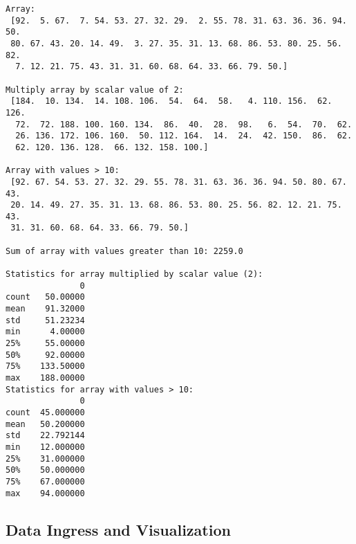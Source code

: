 \documentclass[journal]{IEEEtran}
\begin{document}
\begin{lstlisting}[caption={Arrays following Manipulation}]
Array:
 [92.  5. 67.  7. 54. 53. 27. 32. 29.  2. 55. 78. 31. 63. 36. 36. 94. 50.
 80. 67. 43. 20. 14. 49.  3. 27. 35. 31. 13. 68. 86. 53. 80. 25. 56. 82.
  7. 12. 21. 75. 43. 31. 31. 60. 68. 64. 33. 66. 79. 50.]

Multiply array by scalar value of 2:
 [184.  10. 134.  14. 108. 106.  54.  64.  58.   4. 110. 156.  62. 126.
  72.  72. 188. 100. 160. 134.  86.  40.  28.  98.   6.  54.  70.  62.
  26. 136. 172. 106. 160.  50. 112. 164.  14.  24.  42. 150.  86.  62.
  62. 120. 136. 128.  66. 132. 158. 100.]

Array with values > 10:
 [92. 67. 54. 53. 27. 32. 29. 55. 78. 31. 63. 36. 36. 94. 50. 80. 67. 43.
 20. 14. 49. 27. 35. 31. 13. 68. 86. 53. 80. 25. 56. 82. 12. 21. 75. 43.
 31. 31. 60. 68. 64. 33. 66. 79. 50.]

Sum of array with values greater than 10: 2259.0

Statistics for array multiplied by scalar value (2):
               0
count   50.00000
mean    91.32000
std     51.23234
min      4.00000
25%     55.00000
50%     92.00000
75%    133.50000
max    188.00000
Statistics for array with values > 10:
               0
count  45.000000
mean   50.200000
std    22.792144
min    12.000000
25%    31.000000
50%    50.000000
75%    67.000000
max    94.000000
\end{lstlisting}

\subsection{Data Ingress and Visualization}
\end{document}
